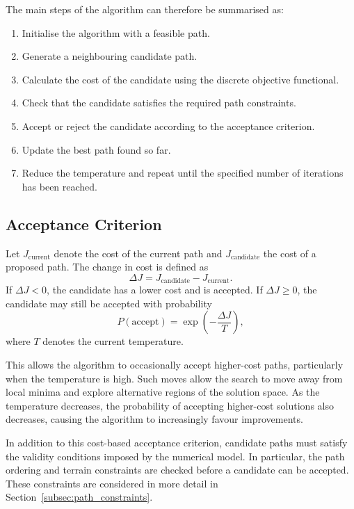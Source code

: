 The main steps of the algorithm can therefore be summarised as:
\begin{enumerate}
    \item Initialise the algorithm with a feasible path.
    \item Generate a neighbouring candidate path.
    \item Calculate the cost of the candidate using the discrete
    objective functional.
    \item Check that the candidate satisfies the required path
    constraints.
    \item Accept or reject the candidate according to the acceptance
    criterion.
    \item Update the best path found so far.
    \item Reduce the temperature and repeat until the specified number
    of iterations has been reached.
\end{enumerate}

\subsection{Acceptance Criterion}
\label{subsec:acceptance_criterion}

Let $J_{\mathrm{current}}$ denote the cost of the current path and
$J_{\mathrm{candidate}}$ the cost of a proposed path. The change in
cost is defined as
\begin{equation}
\Delta J
=
J_{\mathrm{candidate}}
-
J_{\mathrm{current}}.
\label{eq:cost_difference}
\end{equation} If $\Delta J<0$, the candidate has a lower cost and is accepted. If $\Delta J\geq0$, the candidate may still be accepted with probability
\begin{equation}
P(\mathrm{accept})
=
\exp\left(-\frac{\Delta J}{T}\right),
\label{eq:annealing_probability}
\end{equation}
where $T$ denotes the current temperature.

This allows the algorithm to occasionally accept higher-cost paths,
particularly when the temperature is high. Such moves allow the search
to move away from local minima and explore alternative regions of the
solution space. As the temperature decreases, the probability of
accepting higher-cost solutions also decreases, causing the algorithm
to increasingly favour improvements.

In addition to this cost-based acceptance criterion, candidate paths
must satisfy the validity conditions imposed by the numerical model.
In particular, the path ordering and terrain constraints are checked
before a candidate can be accepted. These constraints are considered
in more detail in Section~\ref{subsec:path_constraints}.

